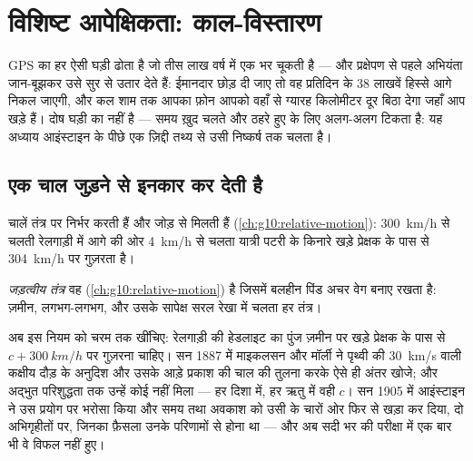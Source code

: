 \chapter{विशिष्ट आपेक्षिकता: काल-विस्तारण}\label{ch:g12:special-relativity}

GPS का हर  ऐसी  घड़ी ढोता है जो तीस लाख वर्ष में एक  भर
चूकती है --- और प्रक्षेपण से पहले अभियंता जान-बूझकर उसे सुर से उतार देते हैं:
ईमानदार छोड़ दी जाए तो वह प्रतिदिन  के 38 लाखवें हिस्से आगे निकल जाएगी, और
कल शाम तक आपका फ़ोन आपको वहाँ से ग्यारह किलोमीटर दूर बिठा देगा जहाँ आप खड़े हैं।
दोष घड़ी का नहीं है --- समय ख़ुद चलते और ठहरे हुए के लिए अलग-अलग टिकता है: यह
अध्याय आइंस्टाइन के पीछे एक ज़िद्दी तथ्य से उसी निष्कर्ष तक चलता है।

\section{एक चाल जुड़ने से इनकार कर देती है}

चालें तंत्र पर निर्भर करती हैं और जोड़ से मिलती हैं (\cref{ch:g10:relative-motion}): \qty{300}{km/h} से चलती
रेलगाड़ी में आगे की ओर \qty{4}{km/h} से चलता यात्री पटरी के किनारे खड़े प्रेक्षक के
पास से \qty{304}{km/h} पर गुज़रता है।

\begin{definition}[जड़त्वीय तंत्र]\label{def:g12:special-relativity:inertial}
\emph{जड़त्वीय तंत्र} वह  (\cref{ch:g10:relative-motion}) है
जिसमें बलहीन पिंड अचर वेग बनाए रखता है: ज़मीन, लगभग-लगभग, और उसके सापेक्ष सरल
रेखा में  चलता हर तंत्र।
\end{definition}

अब इस नियम को चरम तक खींचिए: रेलगाड़ी की हेडलाइट का पुंज ज़मीन पर खड़े प्रेक्षक के
पास से $c + \qty{300}{km/h}$ पर गुज़रना चाहिए। सन 1887 में माइकलसन और मॉर्ली ने पृथ्वी की
\qty{30}{km/s} वाली कक्षीय दौड़ के अनुदिश और उसके आड़े प्रकाश की चाल की तुलना करके ऐसे
ही अंतर खोजे; और अद्भुत परिशुद्धता तक उन्हें कोई नहीं मिला --- हर दिशा में, हर
ऋतु में वही $c$। सन 1905 में आइंस्टाइन ने उस प्रयोग पर भरोसा किया और समय तथा
अवकाश को उसी के चारों ओर फिर से खड़ा कर दिया, दो अभिगृहीतों पर, जिनका फ़ैसला
उनके परिणामों से होना था --- और अब सदी भर की परीक्षा में एक बार भी वे विफल नहीं
हुए।

